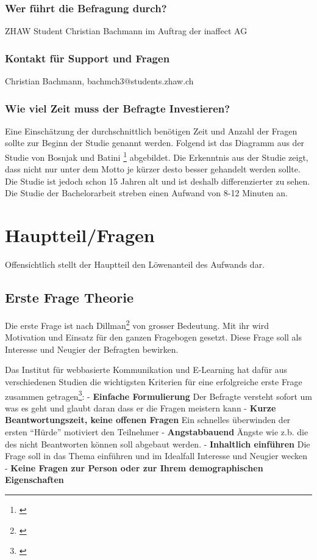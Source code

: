 \subsubsection{Wer führt die Befragung
durch?}\label{wer-fuxfchrt-die-befragung-durch}

ZHAW Student Christian Bachmann im Auftrag der inaffect AG

\subsubsection{Kontakt für Support und
Fragen}\label{kontakt-fuxfcr-support-und-fragen}

Christian Bachmann, bachmch3@students.zhaw.ch

\subsubsection{Wie viel Zeit muss der Befragte
Investieren?}\label{wie-viel-zeit-muss-der-befragte-investieren}

Eine Einschätzung der durchschnittlich benötigen Zeit und Anzahl der
Fragen sollte zur Beginn der Studie genannt werden. Folgend ist das
Diagramm aus der Studie von Bosnjak und Batini \footnote{\autocite{bosnjak}}
abgebildet. Die Erkenntnis aus der Studie zeigt, dass nicht nur unter
dem Motto je kürzer desto besser gehandelt werden sollte. Die Studie ist
jedoch schon 15 Jahren alt und ist deshalb differenzierter zu sehen. Die
Studie der Bachelorarbeit streben einen Aufwand von 8-12 Minuten an.

\newpage

\section{Hauptteil/Fragen}\label{hauptteilfragen}

Offensichtlich stellt der Hauptteil den Löwenanteil des Aufwands dar.

\subsection{Erste Frage Theorie}\label{erste-frage-theorie}

Die erste Frage ist nach Dillman\footnote{\autocite{dillman}} von
grosser Bedeutung. Mit ihr wird Motivation und Einsatz für den ganzen
Fragebogen gesetzt. Diese Frage soll als Interesse und Neugier der
Befragten bewirken.

Das Institut für webbasierte Kommunikation und E-Learning hat dafür aus
verschiedenen Studien die wichtigsten Kriterien für eine erfolgreiche
erste Frage zusammen getragen\footnote{\autocite{fragebogen}}: -
\textbf{Einfache Formulierung} Der Befragte versteht sofort um was es
geht und glaubt daran dass er die Fragen meistern kann - \textbf{Kurze
Beantwortungszeit, keine offenen Fragen} Ein schnelles überwinden der
ersten ``Hürde'' motiviert den Teilnehmer - \textbf{Angstabbauend}
Ängste wie z.b. die des nicht Beantworten können soll abgebaut werden. -
\textbf{Inhaltlich einführen} Die Frage soll in das Thema einführen und
im Idealfall Interesse und Neugier wecken - \textbf{Keine Fragen zur
Person oder zur Ihrem demographischen Eigenschaften}

